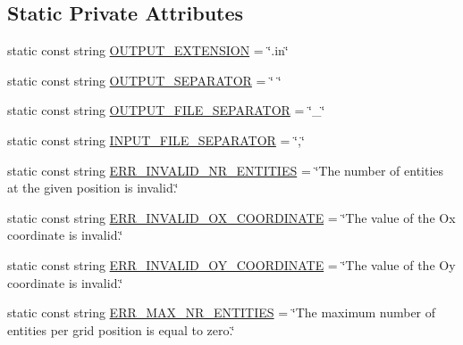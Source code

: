 \subsection*{Static Private Attributes}
\begin{DoxyCompactItemize}
\item 
static const string \hyperlink{classmultiscale_1_1video_1_1RectangularEntityCsvToInputFilesConverter_a44d18b9a690ed20e90f9394bec2756ec}{O\-U\-T\-P\-U\-T\-\_\-\-E\-X\-T\-E\-N\-S\-I\-O\-N} = \char`\"{}.in\char`\"{}
\item 
static const string \hyperlink{classmultiscale_1_1video_1_1RectangularEntityCsvToInputFilesConverter_ad4f94a566c0a2d0f62c38f7e249150f0}{O\-U\-T\-P\-U\-T\-\_\-\-S\-E\-P\-A\-R\-A\-T\-O\-R} = \char`\"{} \char`\"{}
\item 
static const string \hyperlink{classmultiscale_1_1video_1_1RectangularEntityCsvToInputFilesConverter_a4d61fef18668092722ffb876b4bf7dee}{O\-U\-T\-P\-U\-T\-\_\-\-F\-I\-L\-E\-\_\-\-S\-E\-P\-A\-R\-A\-T\-O\-R} = \char`\"{}\-\_\-\char`\"{}
\item 
static const string \hyperlink{classmultiscale_1_1video_1_1RectangularEntityCsvToInputFilesConverter_aad85f336862a4a83f8836acc67640d32}{I\-N\-P\-U\-T\-\_\-\-F\-I\-L\-E\-\_\-\-S\-E\-P\-A\-R\-A\-T\-O\-R} = \char`\"{},\char`\"{}
\item 
static const string \hyperlink{classmultiscale_1_1video_1_1RectangularEntityCsvToInputFilesConverter_ae0bf7e72a315701da331eadb1e76e46b}{E\-R\-R\-\_\-\-I\-N\-V\-A\-L\-I\-D\-\_\-\-N\-R\-\_\-\-E\-N\-T\-I\-T\-I\-E\-S} = \char`\"{}The number of entities at the given position is invalid.\char`\"{}
\item 
static const string \hyperlink{classmultiscale_1_1video_1_1RectangularEntityCsvToInputFilesConverter_a35bb61f22ff213122447ae86f40474c2}{E\-R\-R\-\_\-\-I\-N\-V\-A\-L\-I\-D\-\_\-\-O\-X\-\_\-\-C\-O\-O\-R\-D\-I\-N\-A\-T\-E} = \char`\"{}The value of the Ox coordinate is invalid.\char`\"{}
\item 
static const string \hyperlink{classmultiscale_1_1video_1_1RectangularEntityCsvToInputFilesConverter_a6c34afd00b95610977a85d9178c58559}{E\-R\-R\-\_\-\-I\-N\-V\-A\-L\-I\-D\-\_\-\-O\-Y\-\_\-\-C\-O\-O\-R\-D\-I\-N\-A\-T\-E} = \char`\"{}The value of the Oy coordinate is invalid.\char`\"{}
\item 
static const string \hyperlink{classmultiscale_1_1video_1_1RectangularEntityCsvToInputFilesConverter_a75b3b08c6c220812ea71f7bc07223cdb}{E\-R\-R\-\_\-\-M\-A\-X\-\_\-\-N\-R\-\_\-\-E\-N\-T\-I\-T\-I\-E\-S} = \char`\"{}The maximum number of entities per grid position is equal to zero.\char`\"{}

\end{DoxyCompactItemize}
